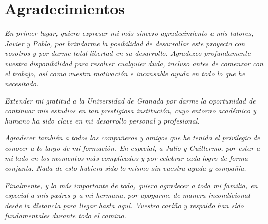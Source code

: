 

\chapter{Agradecimientos}

\emph{En primer lugar, quiero expresar mi más sincero agradecimiento a mis tutores, Javier y Pablo, por brindarme la posibilidad de desarrollar este proyecto con vosotros y por darme total libertad en su desarrollo. Agradezco profundamente vuestra disponibilidad para resolver cualquier duda, incluso antes de comenzar con el trabajo, así como vuestra motivación e incansable ayuda en todo lo que he necesitado.}\newline

\emph{Extender mi gratitud a la Universidad de Granada por darme la oportunidad de continuar mis estudios en tan prestigiosa institución, cuyo entorno académico y humano ha sido clave en mi desarrollo personal y profesional.}\newline

\emph{Agradecer también a todos los compañeros y amigos que he tenido el privilegio de conocer a lo largo de mi formación. En especial, a Julio y Guillermo, por estar a mi lado en los momentos más complicados y por celebrar cada logro de forma conjunta. Nada de esto hubiera sido lo mismo sin vuestra ayuda y compañía.}\newline

\emph{Finalmente, y lo más importante de todo, quiero agradecer a toda mi familia, en especial a mis padres y a mi hermana, por apoyarme de manera incondicional desde la distancia para llegar hasta aquí. Vuestro cariño y respaldo han sido fundamentales durante todo el camino.}\newline

\clearpage
\thispagestyle{empty}
\mbox{}
\newpage
\endinput

